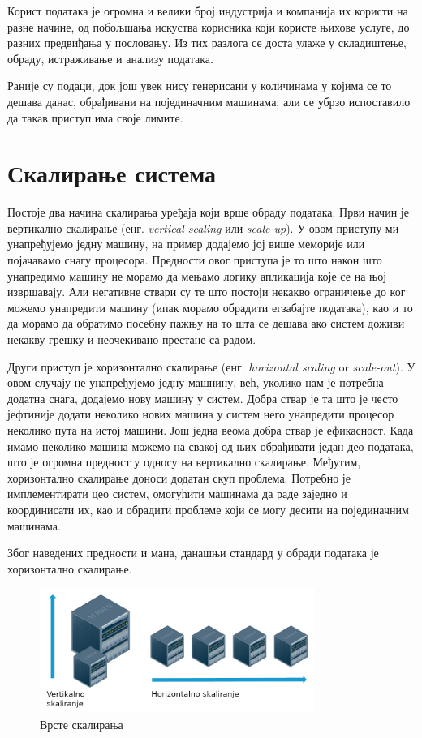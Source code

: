 \documentclass[12pt,oneside]{memoir}
\begin{document}
Корист података је огромна и велики број индустрија и компанија их користи на разне начине, од побољшања искуства корисника који користе њихове услуге, до разних предвиђања у пословању. Из тих разлога се доста улаже у складиштење, обраду, истраживање и анализу података.

Раније су подаци, док још увек нису генерисани у количинама у којима се то дешава данас, обрађивани на појединачним машинама, али се убрзо испоставило да такав приступ има своје лимите.

\section{Скалирање система}
\label{sec:skaliranje}

Постоје два начина скалирања уређаја који врше обраду података. Први начин је вертикално скалирање (енг. \textit{vertical scaling} или \textit{scale-up}). У овом приступу ми унапређујемо једну машину, на пример додајемо јој више меморије или појачавамо снагу процесора. Предности овог приступа је то што након што унапредимо машину не морамо да мењамо логику апликација које се на њој извршавају. Али негативне ствари су те што постоји некакво ограничење до ког можемо унапредити машину (ипак морамо обрадити егзабајте података), као и то да морамо да обратимо посебну пажњу на то шта се дешава ако систем доживи некакву грешку и неочекивано престане са радом. \cite{hadoop_beginner}

Други приступ је хоризонтално скалирање (енг. \textit{horizontal scaling} or \textit{scale-out}). У овом случају не унапређујемо једну машнину, већ, уколико нам је потребна додатна снага, додајемо нову машину у систем. Добра ствар је та што је често јефтиније додати неколико нових машина у систем него унапредити процесор неколико пута на истој машини. Још једна веома добра ствар је ефикасност. Када имамо неколико машина можемо на свакој од њих обрађивати један део података, што је огромна предност у односу на вертикално скалирање. Међутим, хоризонтално скалирање доноси додатан скуп проблема. Потребно је имплементирати цео систем, омогућити машинама да раде заједно и координисати их, као и обрадити проблеме који се могу десити на појединачним машинама. \cite{hadoop_beginner}

Због наведених предности и мана, данашњи стандард у обради података је хоризонтално скалирање.

\begin{figure}[!ht]
  \centering
  \includegraphics[width=0.8\textwidth]{pictures/scaling.png}
  \caption{Врсте скалирања}
  \label{fig:skaliranje}
\end{figure}
\end{document}
